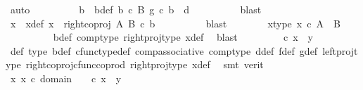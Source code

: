 \begin{isabellebody}
\ auto\isanewline
\ \ \ \ \ \ \isamarkupfalse%
\ \isamarkupfalse%
\ b\ \ b{\isacharunderscore}{\kern0pt}def{\isacharcolon}{\kern0pt}\ {\isachardoublequoteopen}b\ {\isasymin}\isactrlsub c\ B{\isachardoublequoteclose}\ {\isachardoublequoteopen}g\ {\isasymcirc}\isactrlsub c\ b\ {\isacharequal}{\kern0pt}\ d{\isachardoublequoteclose}\isanewline
\ \ \ \ \ \ \ \ \isamarkupfalse%
\ blast\isanewline
\ \ \ \ \ \ \isamarkupfalse%
\ x\ \ x{\isacharunderscore}{\kern0pt}def{\isacharcolon}{\kern0pt}\ {\isachardoublequoteopen}x\ {\isacharequal}{\kern0pt}\ right{\isacharunderscore}{\kern0pt}coproj\ A\ B\ {\isasymcirc}\isactrlsub c\ b{\isachardoublequoteclose}\isanewline
\ \ \ \ \ \ \ \ \isamarkupfalse%
\ blast\isanewline
\ \ \ \ \ \ \isamarkupfalse%
\ x{\isacharunderscore}{\kern0pt}type{\isacharcolon}{\kern0pt}\ {\isachardoublequoteopen}x\ {\isasymin}\isactrlsub c\ A\ {\isasymCoprod}\ B{\isachardoublequoteclose}\isanewline
\ \ \ \ \ \ \ \ \isamarkupfalse%
\ b{\isacharunderscore}{\kern0pt}def\ comp{\isacharunderscore}{\kern0pt}type\ right{\isacharunderscore}{\kern0pt}proj{\isacharunderscore}{\kern0pt}type\ x{\isacharunderscore}{\kern0pt}def\ \isamarkupfalse%
\ blast\isanewline
\ \ \ \ \ \ \isamarkupfalse%
\ {\isachardoublequoteopen}{\isasymphi}\ {\isasymcirc}\isactrlsub c\ x\ {\isacharequal}{\kern0pt}\ y{\isachardoublequoteclose}\isanewline
\ \ \ \ \ \ \ \ \isamarkupfalse%
\ {\isasymphi}{\isacharunderscore}{\kern0pt}def\ {\isasymphi}{\isacharunderscore}{\kern0pt}type\ b{\isacharunderscore}{\kern0pt}def\ cfunc{\isacharunderscore}{\kern0pt}type{\isacharunderscore}{\kern0pt}def\ comp{\isacharunderscore}{\kern0pt}associative\ comp{\isacharunderscore}{\kern0pt}type\ d{\isacharunderscore}{\kern0pt}def\ f{\isacharunderscore}{\kern0pt}def\ g{\isacharunderscore}{\kern0pt}def\ left{\isacharunderscore}{\kern0pt}proj{\isacharunderscore}{\kern0pt}type\ right{\isacharunderscore}{\kern0pt}coproj{\isacharunderscore}{\kern0pt}cfunc{\isacharunderscore}{\kern0pt}coprod\ right{\isacharunderscore}{\kern0pt}proj{\isacharunderscore}{\kern0pt}type\ x{\isacharunderscore}{\kern0pt}def\ \isamarkupfalse%
\ {\isacharparenleft}{\kern0pt}smt\ {\isacharparenleft}{\kern0pt}verit{\isacharparenright}{\kern0pt}{\isacharparenright}{\kern0pt}\isanewline
\ \ \ \ \ \ \isamarkupfalse%
\ \isamarkupfalse%
\ {\isachardoublequoteopen}{\isasymexists}x{\isachardot}{\kern0pt}\ x\ {\isasymin}\isactrlsub c\ domain\ {\isasymphi}\ {\isasymand}\ {\isasymphi}\ {\isasymcirc}\isactrlsub c\ x\ {\isacharequal}{\kern0pt}\ y{\isachardoublequoteclose}\isanewline

\end{isabellebody}
